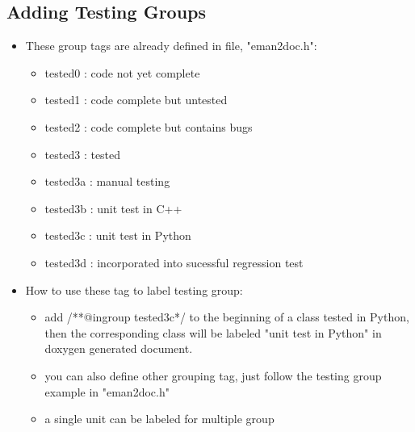      \subsection{Adding Testing Groups} 
      \begin{itemize}
	 \item
	   These group tags are already defined in file, "eman2doc.h":
	   \begin{itemize}
	     \item tested0 : code not yet complete
	     \item tested1 : code complete but untested
	     \item tested2 : code complete but contains bugs
	     \item tested3 : tested
	     \item tested3a : manual testing
	     \item tested3b : unit test in C++
	     \item tested3c : unit test in Python
	     \item tested3d : incorporated into sucessful regression test
	   \end{itemize}
 	 \item
 	   How to use these tag to label testing group:
 	   \begin{itemize}
	     \item add /**@ingroup tested3c*/ to the beginning of a
	     class tested in Python, then the corresponding class will
	     be labeled "unit test in Python" in doxygen generated
	     document. 
             \item  you can also define other grouping tag, just
             follow the testing group example in "eman2doc.h" 
              \item a single unit can be labeled for multiple group 
	   \end{itemize}
 	   \end{itemize}

	   
